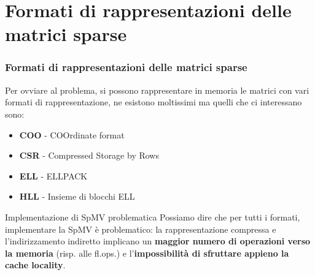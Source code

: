 \documentclass{beamer}
\newcommand{\dflvspace}{\vspace{10pt}}
\begin{document}
\section{Formati di rappresentazioni delle matrici sparse}
\begin{frame}
    \frametitle{Formati di rappresentazioni delle matrici sparse}
    
    Per ovviare al problema, si possono rappresentare in memoria le matrici con vari formati
    di rappresentazione, ne esistono moltissimi ma quelli che ci interessano sono:
    
    \dflvspace
    
    \begin{itemize}
    	\item \textbf{COO} - COOrdinate format
    	\item \textbf{CSR} - Compressed Storage by Rows
    	\item \textbf{ELL} - ELLPACK
    	\item \textbf{HLL} - Insieme di blocchi ELL
    \end{itemize}
    
    \dflvspace
    
    \begin{alertblock}{Implementazione di SpMV problematica}
    Possiamo dire che per tutti i formati, implementare la SpMV è problematico: la 
    rappresentazione compressa e l'indirizzamento indiretto implicano un \textbf{maggior numero di 
    operazioni verso la memoria} (risp. alle fl.ops.)
    e l'\textbf{impossibilità di sfruttare appieno la cache locality}.
    \end{alertblock}
\end{frame}
\end{document}
